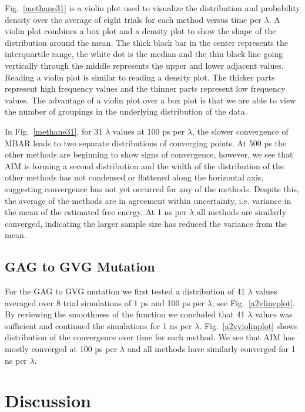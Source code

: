 Fig.\ \ref{methane31} is a violin plot used to visualize the distribution and probability density over the average of eight trials for each method versus time per $\lambda$. A violin plot combines a box plot and a density plot to show the shape of the distribution around the mean. The thick black bar in the center represents the interquartile range, the white dot is the median and the thin black line going vertically through the middle represents the upper and lower adjacent values. Reading a violin plot is similar to reading a density plot. The thicker parts represent high frequency values and the thinner parts represent low frequency values. The advantage of a violin plot over a box plot is that we are able to view the number of groupings in the underlying distribution of the data.

In Fig.\ \ref{methane31}, for 31 $\lambda$ values at 100 ps per $\lambda$, the slower convergence of MBAR leads to two separate distributions of converging points. At 500 ps the other methods are beginning to show signs of convergence, however, we see that AIM is forming a second distribution and the width of the distribution of the other methods has not condensed or flattened along the horizontal axis, suggesting convergence has not yet occurred for any of the methods. Despite this, the average of the methods are in agreement within uncertainty, i.e. variance in the mean of the estimated free energy. At 1 ns per $\lambda$ all methods are similarly converged, indicating the larger sample size has reduced the variance from the mean. 

\subsection{GAG to GVG Mutation}

For the GAG to GVG mutation we first tested a distribution of 41 $\lambda$ values averaged over 8 trial simulations of 1 ps and 100 ps per $\lambda$; see Fig.\ \ref{a2vlineplot}. By reviewing the smoothness of the function we concluded that 41 $\lambda$ values was sufficient and continued the simulations for 1 ns per $\lambda$. Fig.\ \ref{a2vviolinplot} shows distribution of the convergence over time for each method. We see that AIM has mostly converged at 100 ps per $\lambda$ and all methods have similarly converged for 1 ns per $\lambda$.

\section{Discussion}

